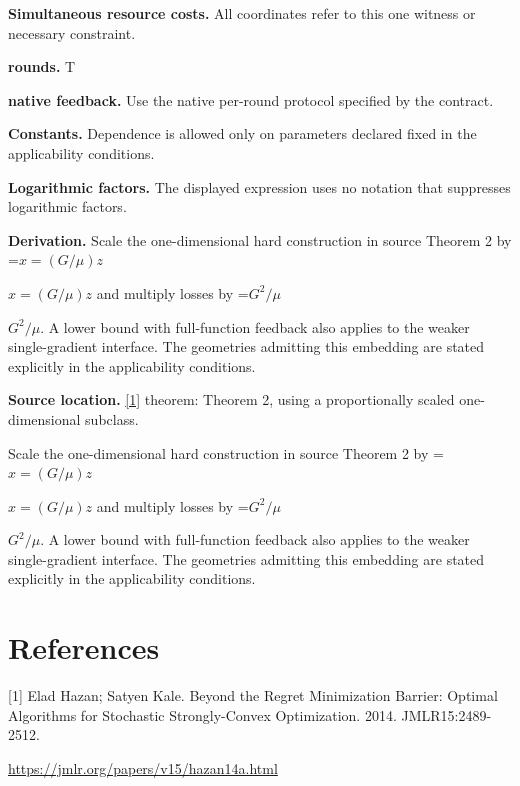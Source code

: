 \documentclass[10pt,a4paper]{article}
\newcommand{\AtlasMath}[1]{\par\begingroup\centering\setbox0=\hbox{$\displaystyle #1$}\ifdim\wd0>1.4\linewidth\typeout{ATLAS WIDE FORMULA: \the\wd0}\fi\ifdim\wd0>\linewidth\resizebox{\linewidth}{!}{\box0}\else\box0\fi\par\endgroup}
\newcommand{\AtlasInlineMath}[1]{\begingroup\setbox0=\hbox{$#1$}\ifdim\wd0>.4\linewidth\endgroup\AtlasMath{#1}\else\endgroup$#1$\fi}
\begin{document}
\textbf{Simultaneous resource costs.} All coordinates refer to this one witness or necessary constraint.

\textbf{rounds.} T

\textbf{native feedback.} Use the native per-round protocol specified by the contract.

\textbf{Constants.} Dependence is allowed only on parameters declared fixed in the applicability conditions.

\textbf{Logarithmic factors.} The displayed expression uses no notation that suppresses logarithmic factors.

\textbf{Derivation.} Scale the one-dimensional hard construction in source Theorem 2 by \AtlasInlineMath{x=(G/\mu)z} and multiply losses by \AtlasInlineMath{G^2/\mu}. A lower bound with full-function feedback also applies to the weaker single-gradient interface. The geometries admitting this embedding are stated explicitly in the applicability conditions.

\textbf{Source location.} \href{https://jmlr.org/papers/v15/hazan14a.html}{[1]} theorem: Theorem 2, using a proportionally scaled one-dimensional subclass.

Scale the one-dimensional hard construction in source Theorem 2 by \AtlasInlineMath{x=(G/\mu)z} and multiply losses by \AtlasInlineMath{G^2/\mu}. A lower bound with full-function feedback also applies to the weaker single-gradient interface. The geometries admitting this embedding are stated explicitly in the applicability conditions.

\section{References}
[1] Elad Hazan; Satyen Kale. Beyond the Regret Minimization Barrier: Optimal Algorithms for Stochastic Strongly-Convex Optimization. 2014. JMLR15:2489-2512.

\url{https://jmlr.org/papers/v15/hazan14a.html}
\end{document}
